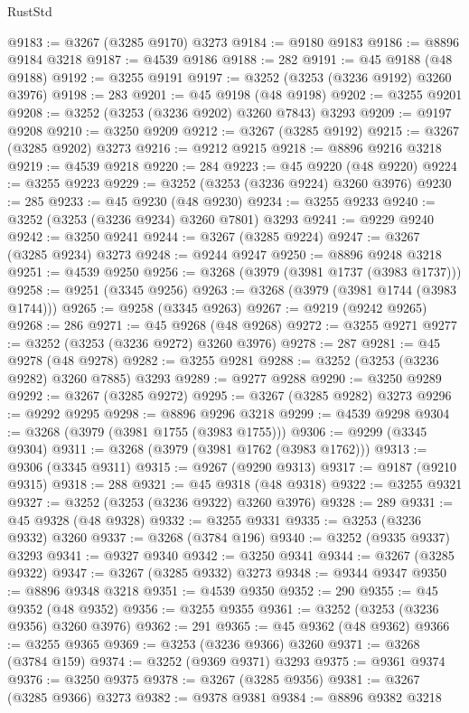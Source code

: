 \begin{lexlean}{RustStd}
\begin{coremodule}
@9183 := @3267 (@3285 @9170) @3273
@9184 := @9180 @9183
@9186 := @8896 @9184 @3218
@9187 := @4539 @9186
@9188 := 282
@9191 := @45 @9188 (@48 @9188)
@9192 := @3255 @9191
@9197 := @3252 (@3253 (@3236 @9192) @3260 @3976)
@9198 := 283
@9201 := @45 @9198 (@48 @9198)
@9202 := @3255 @9201
@9208 := @3252 (@3253 (@3236 @9202) @3260 @7843) @3293
@9209 := @9197 @9208
@9210 := @3250 @9209
@9212 := @3267 (@3285 @9192)
@9215 := @3267 (@3285 @9202) @3273
@9216 := @9212 @9215
@9218 := @8896 @9216 @3218
@9219 := @4539 @9218
@9220 := 284
@9223 := @45 @9220 (@48 @9220)
@9224 := @3255 @9223
@9229 := @3252 (@3253 (@3236 @9224) @3260 @3976)
@9230 := 285
@9233 := @45 @9230 (@48 @9230)
@9234 := @3255 @9233
@9240 := @3252 (@3253 (@3236 @9234) @3260 @7801) @3293
@9241 := @9229 @9240
@9242 := @3250 @9241
@9244 := @3267 (@3285 @9224)
@9247 := @3267 (@3285 @9234) @3273
@9248 := @9244 @9247
@9250 := @8896 @9248 @3218
@9251 := @4539 @9250
@9256 := @3268 (@3979 (@3981 @1737 (@3983 @1737)))
@9258 := @9251 (@3345 @9256)
@9263 := @3268 (@3979 (@3981 @1744 (@3983 @1744)))
@9265 := @9258 (@3345 @9263)
@9267 := @9219 (@9242 @9265)
@9268 := 286
@9271 := @45 @9268 (@48 @9268)
@9272 := @3255 @9271
@9277 := @3252 (@3253 (@3236 @9272) @3260 @3976)
@9278 := 287
@9281 := @45 @9278 (@48 @9278)
@9282 := @3255 @9281
@9288 := @3252 (@3253 (@3236 @9282) @3260 @7885) @3293
@9289 := @9277 @9288
@9290 := @3250 @9289
@9292 := @3267 (@3285 @9272)
@9295 := @3267 (@3285 @9282) @3273
@9296 := @9292 @9295
@9298 := @8896 @9296 @3218
@9299 := @4539 @9298
@9304 := @3268 (@3979 (@3981 @1755 (@3983 @1755)))
@9306 := @9299 (@3345 @9304)
@9311 := @3268 (@3979 (@3981 @1762 (@3983 @1762)))
@9313 := @9306 (@3345 @9311)
@9315 := @9267 (@9290 @9313)
@9317 := @9187 (@9210 @9315)
@9318 := 288
@9321 := @45 @9318 (@48 @9318)
@9322 := @3255 @9321
@9327 := @3252 (@3253 (@3236 @9322) @3260 @3976)
@9328 := 289
@9331 := @45 @9328 (@48 @9328)
@9332 := @3255 @9331
@9335 := @3253 (@3236 @9332) @3260
@9337 := @3268 (@3784 @196)
@9340 := @3252 (@9335 @9337) @3293
@9341 := @9327 @9340
@9342 := @3250 @9341
@9344 := @3267 (@3285 @9322)
@9347 := @3267 (@3285 @9332) @3273
@9348 := @9344 @9347
@9350 := @8896 @9348 @3218
@9351 := @4539 @9350
@9352 := 290
@9355 := @45 @9352 (@48 @9352)
@9356 := @3255 @9355
@9361 := @3252 (@3253 (@3236 @9356) @3260 @3976)
@9362 := 291
@9365 := @45 @9362 (@48 @9362)
@9366 := @3255 @9365
@9369 := @3253 (@3236 @9366) @3260
@9371 := @3268 (@3784 @159)
@9374 := @3252 (@9369 @9371) @3293
@9375 := @9361 @9374
@9376 := @3250 @9375
@9378 := @3267 (@3285 @9356)
@9381 := @3267 (@3285 @9366) @3273
@9382 := @9378 @9381
@9384 := @8896 @9382 @3218

\end{coremodule}
\end{lexlean}
